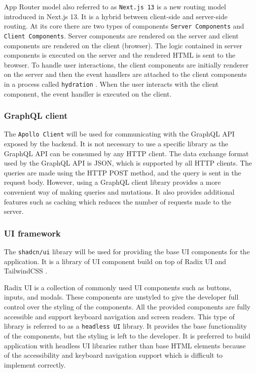 \documentclass[../main.tex]{subfiles}
\begin{document}
App Router model also referred to as \texttt{Next.js 13} is a new routing model introduced in Next.js 13.
It is a hybrid between client-side and server-side routing. At its core there are two types of components
\texttt{Server Components} and \texttt{Client Components}. Server components are rendered on the server and client components are rendered on the client (browser).
The logic contained in server components is executed on the server and the rendered HTML is sent to the browser.
To handle user interactions, the client components are initially renderer on the server and then the event handlers are attached to the client components in a process called \texttt{hydration} \cite{react-hydrateroot}.
When the user interacts with the client component, the event handler is executed on the client.

\subsubsection{GraphQL client}

The \texttt{Apollo Client} \cite{apollo-client} will be used for communicating with the GraphQL API exposed by the backend.
It is not necessary to use a specific library as the GraphQL API can be consumed by any HTTP client.
The data exchange format used by the GraphQL API is JSON, which is supported by all HTTP clients.
The queries are made using the HTTP POST method, and the query is sent in the request body.
However, using a GraphQL client library provides a more convenient way of making queries and mutations.
It also provides additional features such as caching which reduces the number of requests made to the server.

\subsubsection{UI framework}

The \texttt{shadcn/ui} library \cite{shadcnui} will be used for providing the base UI components for the application.
It is a library of UI component build on top of Radix UI \cite{radix-ui} and TailwindCSS \cite{tailwindcss}.

Radix UI is a collection of commonly used UI components such as buttons, inputs, and modals.
These components are unstyled to give the developer full control over the styling of the components.
All the provided components are fully accessible and support keyboard navigation and screen readers.
This type of library is referred to as a \texttt{headless UI} library. It provides the base functionality of the components, but the styling is left to the developer.
It is preferred to build application with headless UI libraries rather than base HTML elements because of the accessibility and keyboard navigation support
which is difficult to implement correctly.
\end{document}

